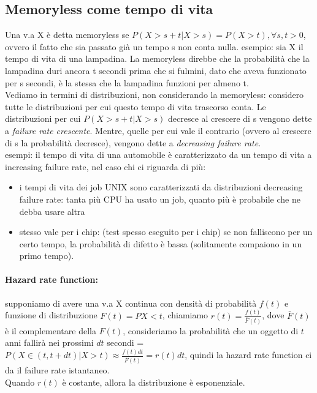 \documentclass{article}
\begin{document}
\subsection{Memoryless come tempo di vita}
Una v.a X è detta memoryless se $P(X > s + t| X > s) = P(X > t), \forall s,t > 0$, ovvero il fatto che sia passato già un tempo s non conta nulla. esempio: sia X il tempo di vita di una lampadina. La memoryless direbbe che la probabilità che la lampadina duri ancora t secondi prima che si fulmini, dato che aveva funzionato per s secondi, è la stessa che la lampadina funzioni per almeno t.\\ Vediamo in termini di distribuzioni, non considerando la memoryless: considero tutte le distribuzioni per cui questo tempo di vita trascorso conta. Le distribuzioni per cui $P(X > s + t |X > s)$ decresce al crescere di s vengono dette a \textit{failure rate crescente}. Mentre, quelle per cui vale il contrario (ovvero al crescere di s la probabilità decresce), vengono dette a \textit{decreasing failure rate}.\\ esempi: il tempo di vita di una automobile è caratterizzato da un tempo di vita a increasing failure rate, nel caso chi ci riguarda di più:
\begin{itemize}
\item i tempi di vita dei job UNIX sono caratterizzati da distribuzioni decreasing failure rate: tanta più CPU ha usato un job, quanto più è probabile che ne debba usare altra
\item stesso vale per i chip: (test spesso eseguito per i chip) se non falliscono per un certo tempo, la probabilità di difetto è bassa (solitamente compaiono in un primo tempo).
\end{itemize}
\paragraph{Hazard rate function:}supponiamo di avere una v.a X continua con densità di probabilità $f(t)$ e funzione di distribuzione $F(t) = P{X < t}$, chiamiamo $r(t) = \frac{f(t)}{\bar{F}(t)}$, dove $\bar{F}(t)$ è il complementare della $F(t)$, consideriamo la probabilità che un oggetto di $t$ anni fallirà nei prossimi $dt$ secondi = $P(X \in (t, t + dt)|X > t) \approx \frac{f(t)dt}{\bar{F}(t)} = r(t)dt$, quindi la hazard rate function ci da il failure rate istantaneo.\\ Quando $r(t)$ è costante, allora la distribuzione è esponenziale.
\end{document}
